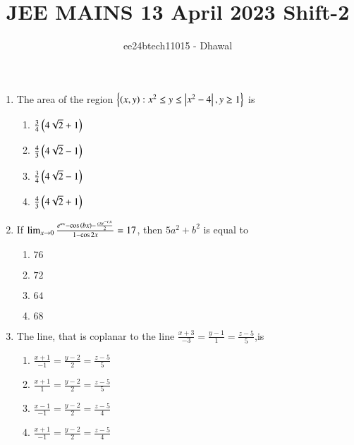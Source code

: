 \documentclass[journal]{IEEEtran}
\theoremstyle{remark}
\begin{document}

\onecolumn

\title{JEE MAINS 13 April 2023 Shift-2}
\author{ee24btech11015 - Dhawal}
\maketitle

\renewcommand{\thefigure}{\theenumi}
\renewcommand{\thetable}{\theenumi}

\begin{enumerate}
	\item The area of the region $\left\{\left(x,y\right) : x^2 \leq y \leq \left\vert x^2 - 4\right\vert , y \geq 1 \right\}$ is \hfill{}

\begin{multicols}{4}
\begin{enumerate}
\item $\frac{3}{4}\left(4\sqrt{2}+1\right)$
\item $\frac{4}{3}\left(4\sqrt{2}-1\right)$
\item $\frac{3}{4}\left(4\sqrt{2}-1\right)$
\item $\frac{4}{3}\left(4\sqrt{2}+1\right)$
\end{enumerate}
\end{multicols}

	\item If $\lim_{x \to 0} \frac{e^{ax} - \cos{\ensuremath{\left(bx\right)}} - \frac{cxe^{-cx}}{2}}{1 - \cos{2x}} = 17
$, then $5a^2+b^2$ is equal to\hfill{}

\begin{multicols}{4}
\begin{enumerate}
\item $76$
\item $72$
\item $64$
\item $68$
\end{enumerate}
\end{multicols}

\item The line, that is coplanar to the line $\frac{x + 3}{-3} = \frac{y - 1}{1} = \frac{z - 5}{5}$,is\hfill{}

\begin{multicols}{4}
\begin{enumerate}
\item $\frac{x + 1}{-1} = \frac{y - 2}{2} = \frac{z - 5}{5}$
\item $\frac{x + 1}{1} = \frac{y - 2}{2} = \frac{z - 5}{5}$
\item $\frac{x - 1}{-1} = \frac{y - 2}{2} = \frac{z - 5}{4}$
\item $\frac{x + 1}{-1} = \frac{y - 2}{2} = \frac{z - 5}{4}$
\end{enumerate}
\end{multicols}


\end{enumerate}
\end{document}
